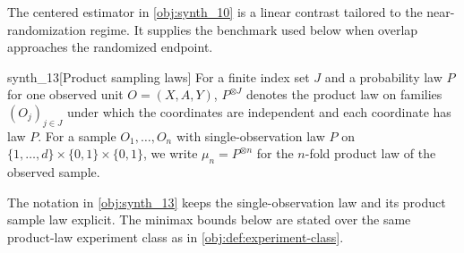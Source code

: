 \documentclass[11pt]{article}
\begin{document}
The centered estimator in \cref{obj:synth_10} is a linear contrast tailored to the near-randomization regime. It supplies the benchmark used below when overlap approaches the randomized endpoint.

\begin{definitionv}{synth_13}[Product sampling laws]
For a finite index set \(J\) and a probability law \(P\) for one observed unit \(O=(X,A,Y)\), \(P^{\otimes J}\) denotes the product law on families \((O_j)_{j\in J}\) under which the coordinates are independent and each coordinate has law \(P\). For a sample \(O_1,\ldots,O_n\) with single-observation law \(P\) on \(\{1,\ldots,d\}\times\{0,1\}\times\{0,1\}\), we write \(\mu_n=P^{\otimes n}\) for the \(n\)-fold product law of the observed sample.
\end{definitionv}

The notation in \cref{obj:synth_13} keeps the single-observation law and its product sample law explicit. The minimax bounds below are stated over the same product-law experiment class as in \cref{obj:def:experiment-class}.
\end{document}
